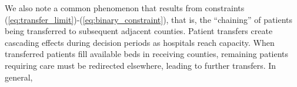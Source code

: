 \documentclass{article}
\begin{document}
We also note a common phenomenon that results from constraints (\ref{eq:transfer_limit})-(\ref{eq:binary_constraint}), that is, the ``chaining'' of patients being transferred to subsequent adjacent counties. Patient transfers create cascading effects during decision periods as hospitals reach capacity. When transferred patients fill available beds in receiving counties, remaining patients requiring care must be redirected elsewhere, leading to further transfers. In general, 
\end{document}
